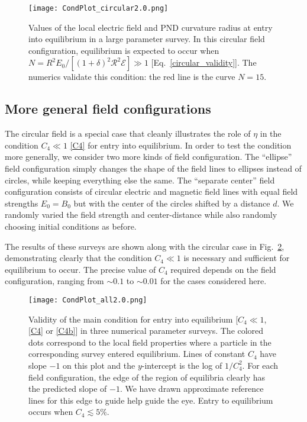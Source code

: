 \documentclass[amsmath,amssymb,nofootinbib,notitlepage,superscriptaddress,twocolumn]{revtex4-2}
\begin{document}
\begin{figure}
    \centering
    \texttt{[image: CondPlot\_circular2.0.png]}\\
    \caption{Values of the local electric field and PND curvature radius at entry into equilibrium in a large parameter survey.  In this circular field configuration, equilibrium is expected to occur when $N=R^2 E_0/[(1+\delta)^2 \mathcal{R}^2 \mathcal{E}]\gg1$ [Eq.~\eqref{circular_validity}].  The numerics validate this condition: the red line is the curve $N=15$.
    }
    \label{fig:CondPlot_circular}
\end{figure}

\subsection{More general field configurations}

The circular field is a special case that cleanly illustrates the role of $\eta$ in the condition $C_4\ll1$ \eqref{C4} for entry into equilibrium.  In order to test the condition more generally, we consider two more kinds of field configuration.  The ``ellipse'' field configuration simply changes the shape of the field lines to ellipses instead of circles, while keeping everything else the same.  The ``separate center'' field configuration consists of circular electric and magnetic field lines with equal field strengths $E_0=B_0$ but with the center of the circles shifted by a distance $d$.  We randomly varied the field strength and center-distance while also randomly choosing initial conditions as before.  

The results of these surveys are shown along with the circular case in Fig.~\ref{fig:CondPlot_all}, demonstrating clearly that the condition $C_4 \ll 1$ is necessary and sufficient for equilibrium to occur.  The precise value of $C_4$ required depends on the field configuration, ranging from $\sim0.1$ to $\sim0.01$ for the cases considered here.

\begin{figure}
    \centering
    \texttt{[image: CondPlot\_all2.0.png]}\\
    \caption{Validity of the main condition for entry into equilibrium [$C_4\ll1$, \eqref{C4} or \eqref{C4b}] in three numerical parameter surveys.  The colored dots correspond to the local field properties where a particle in the corresponding survey entered equilibrium.  Lines of constant $C_4$ have slope $-1$ on this plot and the $y$-intercept is the log of $1/C_4^2$.  For each field configuration, the edge of the region of equilibria clearly has the predicted slope of $-1$.  We have drawn approximate reference lines for this edge to guide help guide the eye.  Entry to equilibrium occurs when $C_4 \lesssim 5\%$.}
    \label{fig:CondPlot_all}
\end{figure}
\end{document}
